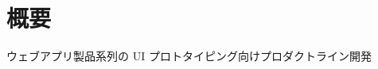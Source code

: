 \hypertarget{ux6982ux8981}{%
\section{概要}\label{ux6982ux8981}}

ウェブアプリ製品系列の UI プロトタイピング向けプロダクトライン開発
